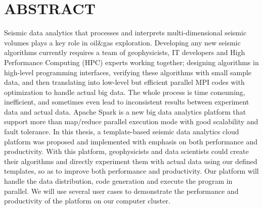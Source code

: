 %
%
%

\chapter*{ABSTRACT}

\pagestyle{plain} %
\setcounter{page}{2}

\indent Seismic data analytics that processes and interprets multi-dimensional seismic volumes plays a key role in oil\&gas exploration. Developing any new seismic algorithms currently requires a team of geophysicists, IT developers and High Performance Computing (HPC) experts working together; designing algorithms in high-level programming interfaces, verifying these algorithms with small sample data, and then translating into low-level but efficient parallel MPI codes with optimization to handle actual big data. The whole process is time consuming, inefficient, and sometimes even lead to inconsistent results between experiment data and actual data. Apache Spark is a new big data analytics platform that support more than map/reduce parallel execution mode with good scalability and fault tolerance. In this thesis, a template-based seismic data analytics cloud platform was proposed and implemented with emphasis on both performance and productivity. With this platform, geophysicists and data scientists could create their algorithms and directly experiment them with actual data using our defined templates, so as to improve both performance and productivity. Our platform will handle the data distribution, code generation and execute the program in parallel. We will use several user cases to demonstrate the performance and productivity of the platform on our computer cluster.  


 

\pagebreak{}
